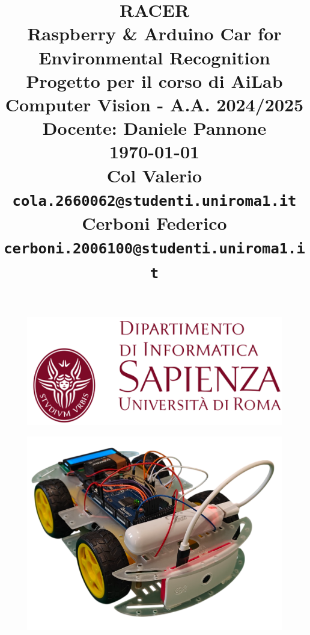 \documentclass{article}
\begin{document}
\begin{figure}
    \includegraphics[width=0.45\linewidth]{logo.png}
\end{figure}

\title{%
  \textbf{RACER} \\
  \Large\textbf{Raspberry \& Arduino Car for Environmental Recognition} \\
  \vspace{1cm}
  \large{Progetto per il corso di AiLab Computer Vision - A.A. 2024/2025} \\
  \vspace{0.5cm}
  \large{Docente: Daniele Pannone} \\
  \vspace{0.5cm}
  \large \today\\[24pt]
    
  \large{Col Valerio \texttt{cola.2660062@studenti.uniroma1.it}}\\
  \large{Cerboni Federico \texttt{cerboni.2006100@studenti.uniroma1.it}} 
}

\date{}
\maketitle

\begin{figure}[h!]
    \centering
    \includegraphics[width=0.7\linewidth]{racer.png}
\end{figure}
\end{document}
